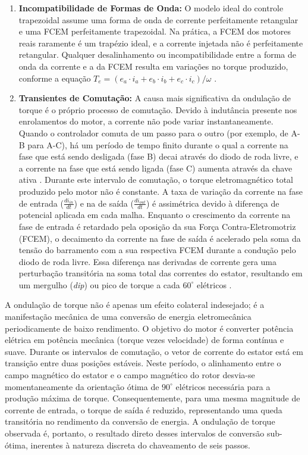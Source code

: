 \begin{enumerate}
    \item \textbf{Incompatibilidade de Formas de Onda:} O modelo ideal do controle trapezoidal assume uma forma de onda de corrente perfeitamente retangular e uma FCEM perfeitamente trapezoidal. Na prática, a FCEM dos motores reais raramente é um trapézio ideal, e a corrente injetada não é perfeitamente retangular. Qualquer desalinhamento ou incompatibilidade entre a forma de onda da corrente e a da FCEM resulta em variações no torque produzido, conforme a equação $T_{e} = (e_{a} \cdot i_{a} + e_{b} \cdot i_{b} + e_{c} \cdot i_{c}) / \omega$ \cite{hendershot1994design}.

    \item \textbf{Transientes de Comutação:} A causa mais significativa da ondulação de torque é o próprio processo de comutação. Devido à indutância presente nos enrolamentos do motor, a corrente não pode variar instantaneamente. Quando o controlador comuta de um passo para o outro (por exemplo, de A-B para A-C), há um período de tempo finito durante o qual a corrente na fase que está sendo desligada (fase B) decai através do diodo de roda livre, e a corrente na fase que está sendo ligada (fase C) aumenta através da chave ativa \cite{jahns1996pulsating, joice2013compensation}. Durante este intervalo de comutação, o torque eletromagnético total produzido pelo motor não é constante. A taxa de variação da corrente na fase de entrada ($\frac{di_{in}}{dt}$) e na de saída ($\frac{di_{out}}{dt}$) é assimétrica devido à diferença de potencial aplicada em cada malha. Enquanto o crescimento da corrente na fase de entrada é retardado pela oposição da sua Força Contra-Eletromotriz (FCEM), o decaimento da corrente na fase de saída é acelerado pela soma da tensão do barramento com a sua respectiva FCEM durante a condução pelo diodo de roda livre. Essa diferença nas derivadas de corrente gera uma perturbação transitória na soma total das correntes do estator, resultando em um mergulho (\textit{dip}) ou pico de torque a cada $60^{\circ}$ elétricos \cite{choi1998commutation, chen2019commutation}.

\end{enumerate}

A ondulação de torque não é apenas um efeito colateral indesejado; é a manifestação mecânica de uma conversão de energia eletromecânica periodicamente de baixo rendimento. O objetivo do motor é converter potência elétrica em potência mecânica (torque vezes velocidade) de forma contínua e suave. Durante os intervalos de comutação, o vetor de corrente do estator está em transição entre duas posições estáveis. Neste período, o alinhamento entre o campo magnético do estator e o campo magnético do rotor desvia-se momentaneamente da orientação ótima de $90^{\circ}$ elétricos necessária para a produção máxima de torque. Consequentemente, para uma mesma magnitude de corrente de entrada, o torque de saída é reduzido, representando uma queda transitória no rendimento da conversão de energia. A ondulação de torque observada é, portanto, o resultado direto desses intervalos de conversão sub-ótima, inerentes à natureza discreta do chaveamento de seis passos.

